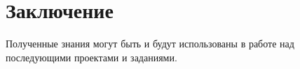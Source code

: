 \documentclass[a4paper, final]{article}
\begin{document}
\newpage
\section*{Заключение}
Полученные знания могут быть и будут использованы в работе над последующими проектами и заданиями.

\cleardoublepage
{}
\newpage
\begin{thebibliography}{0}
\end{thebibliography}
\end{document}
